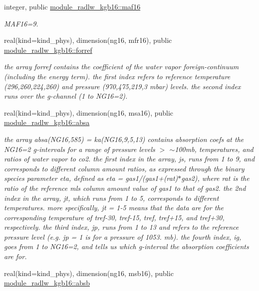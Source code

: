 \begin{Indent}
\begin{DoxyCompactItemize}
integer, public \hyperlink{group__module__radlw__kgbnn_gaae4c96f4a2ae49c573189f2d63ccd4a3}{module\+\_\+radlw\+\_\+kgb16\+::maf16}
\begin{DoxyCompactList}\small\item\em M\+A\+F16=9. \end{DoxyCompactList}\item 
real(kind=kind\+\_\+phys), dimension(ng16, mfr16), public \hyperlink{group__module__radlw__kgbnn_ga4402ed68e18459813a6c9ede5d6ba9cc}{module\+\_\+radlw\+\_\+kgb16\+::forref}
\begin{DoxyCompactList}\small\item\em the array forref contains the coefficient of the water vapor foreign-\/continuum (including the energy term). the first index refers to reference temperature (296,260,224,260) and pressure (970,475,219,3 mbar) levels. the second index runs over the g-\/channel (1 to N\+G16=2). \end{DoxyCompactList}\item 
real(kind=kind\+\_\+phys), dimension(ng16, msa16), public \hyperlink{group__module__radlw__kgbnn_ga2734b420b7e8e8393a8bf1b595a3cf09}{module\+\_\+radlw\+\_\+kgb16\+::absa}
\begin{DoxyCompactList}\small\item\em the array absa(\+N\+G16,585) = ka(\+N\+G16,9,5,13) contains absorption coefs at the N\+G16=2 g-\/intervals for a range of pressure levels $>$ $\sim$100mb, temperatures, and ratios of water vapor to co2. the first index in the array, js, runs from 1 to 9, and corresponds to different column amount ratios, as expressed through the binary species parameter eta, defined as eta = gas1/(gas1+(rat)$\ast$gas2), where rat is the ratio of the reference mls column amount value of gas1 to that of gas2. the 2nd index in the array, jt, which runs from 1 to 5, corresponds to different temperatures. more specifically, jt = 1-\/5 means that the data are for the corresponding temperature of tref-\/30, tref-\/15, tref, tref+15, and tref+30, respectively. the third index, jp, runs from 1 to 13 and refers to the reference pressure level (e.\+g. jp = 1 is for a pressure of 1053. mb). the fourth index, ig, goes from 1 to N\+G16=2, and tells us which g-\/interval the absorption coefficients are for. \end{DoxyCompactList}\item 
real(kind=kind\+\_\+phys), dimension(ng16, msb16), public \hyperlink{group__module__radlw__kgbnn_gae856b42252b71d4d588ea5e19e871cac}{module\+\_\+radlw\+\_\+kgb16\+::absb}

\end{DoxyCompactItemize}
\end{Indent}
